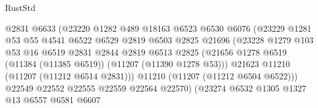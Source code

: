 \begin{lexlean}{RustStd}
\begin{coremodule}
                                    @2831
                                    @6633
                                    (@23220
                                      @1282
                                      @489
                                      @18163
                                      @6523
                                      @6530
                                      @6076
                                      (@23229
                                        @1281
                                        @53
                                        @55
                                        @4541
                                        @6522
                                        @6529
                                        @2819
                                        @6503
                                        @2825
                                        @21696
                                        (@23228
                                          @1279
                                          @103
                                          @53
                                          @16
                                          @6519
                                          @2831
                                          @2844
                                          @2819
                                          @6513
                                          @2825
                                          (@21656
                                            @1278
                                            @6519
                                            (@11384 (@11385 @6519))
                                            (@11207 (@11390 @1278 @53)))
                                          @21623
                                          @11210
                                          (@11207 (@11212 @6514 @2831)))
                                        @11210
                                        (@11207 (@11212 @6504 @6522)))
                                      @22549
                                      @22552
                                      @22555
                                      @22559
                                      @22564
                                      @22570)
                                    (@23274
                                      @6532
                                      @1305
                                      @1327
                                      @13
                                      @6557
                                      @6581
                                      @6607

\end{coremodule}
\end{lexlean}
